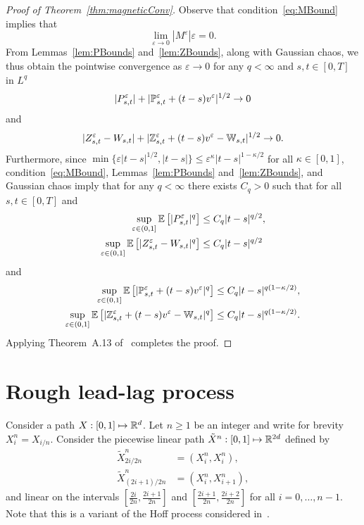 \documentclass{article}
\begin{document}
\begin{proof}[Proof of Theorem~\ref{thm:magneticConv}]
Observe that condition~\eqref{eq:MBound} implies that
\[
\lim_{\varepsilon \rightarrow 0}|M^\varepsilon|\varepsilon = 0.
\]
From Lemmas~\ref{lem:PBounds} and~\ref{lem:ZBounds}, along with Gaussian chaos, we thus obtain the pointwise convergence as $\varepsilon \rightarrow 0$ for any $q < \infty$ and $s,t \in [0,T]$ in $L^q$
\[
|P^\varepsilon_{s,t}| + |\Pbb^\varepsilon_{s,t} + (t-s)v^\varepsilon|^{1/2} \rightarrow 0
\]
and
\[
|Z^\varepsilon_{s,t} - W_{s,t}| + |\Z^\varepsilon_{s,t} + (t-s)v^\varepsilon - \W_{s,t}|^{1/2} \rightarrow 0.
\]
Furthermore, since $\min\{\varepsilon |t-s|^{1/2}, |t-s|\} \leq \varepsilon^{\kappa}|t-s|^{1-\kappa/2}$ for all $\kappa \in [0,1]$, condition~\eqref{eq:MBound}, Lemmas~\ref{lem:PBounds} and~\ref{lem:ZBounds}, and Gaussian chaos imply that for any $q < \infty$ there exists $C_q > 0$ such that for all $s,t \in [0,T]$ and
\begin{align*}
\sup_{\varepsilon \in (0,1]} \EEE{|P^\varepsilon_{s,t}|^q} &\leq C_q|t-s|^{q/2}, \\
\sup_{\varepsilon \in (0,1]} \EEE{|Z^\varepsilon_{s,t} - W_{s,t}|^q} &\leq C_q|t-s|^{q/2}
\end{align*}
and
\begin{align*}
\sup_{\varepsilon \in (0,1]} \EEE{|\Pbb^\varepsilon_{s,t} + (t-s)v^\varepsilon|^q} &\leq C_q|t-s|^{q(1-\kappa/2)}, \\
\sup_{\varepsilon \in (0,1]} \EEE{|\Z^\varepsilon_{s,t} + (t-s)v^\varepsilon - \W_{s,t}|^q} &\leq C_q|t-s|^{q(1-\kappa/2)}.
\end{align*}
Applying Theorem~A.13 of~\cite{FrizVictoir10} completes the proof.
\end{proof}


\section{Rough lead-lag process}\label{subsec:Hoff}

Consider a path $X : [0,1] \mapsto \mathbb R^d$. Let $n \geq 1$ be an integer and write for brevity $X^n_i = X_{i/n}$. Consider the piecewise linear path $\tilde X^n : [0,1] \mapsto \mathbb R^{2d}$ defined by
\begin{align*}
\tilde X^n_{2i/2n} &= (X^n_i, X^n_i), \\
\tilde X^n_{(2i+1)/2n} &= (X^n_i, X^n_{i+1}),
\end{align*}
and linear on the intervals $\left[\frac{2i}{2n}, \frac{2i+1}{2n}\right]$ and $\left[\frac{2i+1}{2n}, \frac{2i+2}{2n}\right]$ for all $i = 0,\ldots, n-1$. Note that this is a variant of the Hoff process considered in~\cite{Flint16}.
\end{document}
